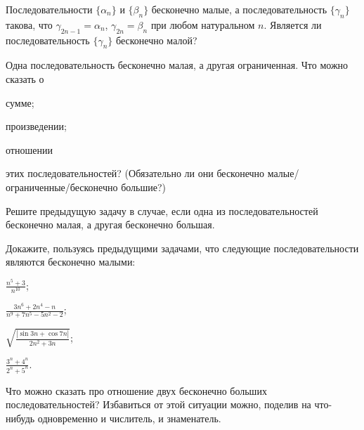 \documentclass[a4paper, 12pt, num=2426, date=01.09.2020]{listok}
\begin{document}
\begin{problem}
    Последовательности $\{\alpha_n\}$ и $\{\beta_n\}$ бесконечно малые, а последовательность $\{\gamma_n\}$ такова,
    что $\gamma_{2n-1} = \alpha_n$, $\gamma_{2n} = \beta_n$ при любом натуральном $n$.
    Является ли последовательность $\{\gamma_n\}$ бесконечно малой?
\end{problem}

\begin{problem}
    Одна последовательность бесконечно малая, а другая ограниченная.
    Что можно сказать о
    \begin{probparts}
        \item сумме;
        \item произведении;
        \item отношении
    \end{probparts}
    этих последовательностей? (Обязательно ли они бесконечно малые/ограниченные/бесконечно большие?)
\end{problem}

\begin{problem}
    Решите предыдущую задачу в случае, если одна из последовательностей бесконечно малая, а другая бесконечно большая.
\end{problem}

\begin{problem}[$\mathghost$]
    Докажите, пользуясь предыдущими задачами, что следующие последовательности являются бесконечно малыми:
    \begin{probparts}
        \item \mbox{\large$\frac{n^5 + 3}{n^{10}}$};
        \item \mbox{\large$\frac{3n^6 + 2n^4 - n}{n^9 + 7n^5 - 5n^2 - 2}$};
        \item \mbox{\large$\sqrt{\frac{|\sin{3n} + \cos{7n}|}{2n^2 + 3n}}$};
        \item \mbox{\large$\frac{3^n + 4^n}{2^n + 5^n}$}.
    \end{probparts}
\end{problem}
\begin{note}
    Что можно сказать про отношение двух бесконечно больших последовательностей? Избавиться от этой ситуации можно, поделив на что-нибудь одновременно и числитель, и знаменатель.
\end{note}
\end{document}
